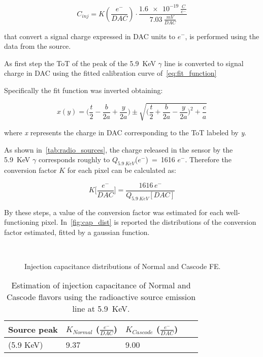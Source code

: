 \begin{equation}
C_{inj} = K (\frac{e^{-}}{DAC}) \cdot \frac{\SI{1.6e-19}{\frac{C}{e^{-}}}}{\SI{7.03}{\frac{mV}{DAC}}}
\end{equation}

that convert a signal charge expressed in DAC units to $e^{-}$, is performed using the data from the  source. 

As first step the ToT of the peak of the \SI{5.9}{KeV} $\gamma$ line is converted to signal charge in DAC using the fitted calibration curve of~\autoref{eq:fit_function}

Specifically the fit function was inverted obtaining:

\begin{equation}
x(y) = \bigg(\frac{t}{2} - \frac{b}{2a} + \frac{y}{2a}\bigg) \pm \sqrt{\bigg(\frac{t}{2} + \frac{b}{2a} - \frac{y}{2a}\bigg)^{2} + \frac{c}{a}}
\end{equation}

where \textit{x} represents the charge in DAC corresponding to the ToT labeled by \textit{y}.

As shown in~\autoref{tab:radio_sources}, the charge released in the sensor by the \SI{5.9}{KeV} $\gamma$ corresponds roughly to $Q_{\SI{5.9}{KeV}}$($e^{-}$)~=~1616 $e^{-}$. Therefore the conversion factor $K$ for each pixel can be calculated as:

\begin{equation}
K\bigg[\frac{e^{-}}{DAC}\bigg] = \frac{1616 \, e^{-}}{Q_{\SI{5.9}{KeV}}[DAC]}
\label{eq:inj_cap}
\end{equation} 

By these steps, a value of the conversion factor was estimated for each well-functioning pixel. In~\autoref{fig:cap_dist} is reported the distributions of the conversion factor estimated, fitted by a gaussian function.

\begin{figure}
\centering
{}\quad
{}\\
\caption{Injection capacitance distributions of Normal and Cascode FE.}
\label{fig:cap_dist}
\end{figure} 


\begin{table}[h!]
\centering
\begin{tabular}{>{} C{2.8cm}|C{1.7cm}|C{1.8cm}|C{1.7cm}|C{1.7cm}}
Source peak & $K_{Normal}$ ($\frac{e^{-}}{DAC}$) & $K_{Cascode}$ ($\frac{e^{-}}{DAC}$)\\[2.5ex]
\hline
{} (5.9 KeV) & 9.37 & 9.00\\[1ex]
\hline
\end{tabular}
\caption{Estimation of injection capacitance of Normal and Cascode flavors using the  radioactive source emission line at \SI{5.9}{KeV}.}
\label{tab:cap_mean}
\end{table}

